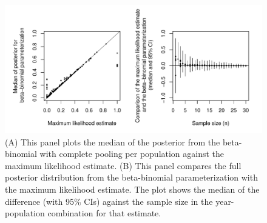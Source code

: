 \documentclass[12pt, oneside, titlepage]{article}   	%
\begin{document}




\clearpage

 \begin{figure}[h]
   \centering
       \includegraphics[page=1,width=.9\textwidth]{../../figures/appendix-x-mle_bayes}  
    \caption{ (A) This panel plots the median of the posterior from the beta-binomial with complete pooling per population against the maximum likelihood estimate. (B) This panel compares the full posterior distribution from the beta-binomial parameterization with the maximum likelihood estimate. The plot shows the median of the difference (with 95\% CIs) against the sample size in the year-population combination for that estimate.  }
 \label{fig:mle_bayes}
\end{figure}
\end{document}
